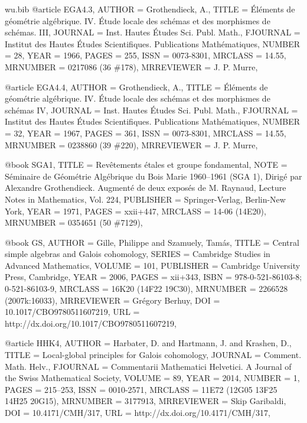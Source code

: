 \documentclass{amsart}
\numberwithin{equation}{section}
\theoremstyle{plain}
\theoremstyle{definition}
\begin{document}
\begin{filecontents}{wu.bib}
@article {EGA4.3, 
    AUTHOR = {Grothendieck, A.},
     TITLE = {\'{E}l\'ements de g\'eom\'etrie alg\'ebrique. {IV}. \'{E}tude
              locale des sch\'emas et des morphismes de sch\'emas. {III}},
   JOURNAL = {Inst. Hautes \'Etudes Sci. Publ. Math.},
  FJOURNAL = {Institut des Hautes \'Etudes Scientifiques. Publications
              Math\'ematiques},
    NUMBER = {28},
      YEAR = {1966},
     PAGES = {255},
      ISSN = {0073-8301},
   MRCLASS = {14.55},
  MRNUMBER = {0217086 (36 \#178)},
MRREVIEWER = {J. P. Murre},
}

@article {EGA4.4, 
    AUTHOR = {Grothendieck, A.},
     TITLE = {\'{E}l\'ements de g\'eom\'etrie alg\'ebrique. {IV}. \'{E}tude
              locale des sch\'emas et des morphismes de sch\'emas {IV}},
   JOURNAL = {Inst. Hautes \'Etudes Sci. Publ. Math.},
  FJOURNAL = {Institut des Hautes \'Etudes Scientifiques. Publications
              Math\'ematiques},
    NUMBER = {32},
      YEAR = {1967},
     PAGES = {361},
      ISSN = {0073-8301},
   MRCLASS = {14.55},
  MRNUMBER = {0238860 (39 \#220)},
MRREVIEWER = {J. P. Murre},
}

@book {SGA1, 
     TITLE = {Rev\^etements \'etales et groupe fondamental},
      NOTE = {S{\'e}minaire de G{\'e}om{\'e}trie Alg{\'e}brique du Bois
              Marie 1960--1961 (SGA 1),
              Dirig{\'e} par Alexandre Grothendieck. Augment{\'e} de deux
              expos{\'e}s de M. Raynaud,
              Lecture Notes in Mathematics, Vol. 224},
 PUBLISHER = {Springer-Verlag, Berlin-New York},
      YEAR = {1971},
     PAGES = {xxii+447},
   MRCLASS = {14-06 (14E20)},
  MRNUMBER = {0354651 (50 \#7129)},
}

@book {GS, 
    AUTHOR = {Gille, Philippe and Szamuely, Tam{\'a}s},
     TITLE = {Central simple algebras and {G}alois cohomology},
    SERIES = {Cambridge Studies in Advanced Mathematics},
    VOLUME = {101},
 PUBLISHER = {Cambridge University Press, Cambridge},
      YEAR = {2006},
     PAGES = {xii+343},
      ISBN = {978-0-521-86103-8; 0-521-86103-9},
   MRCLASS = {16K20 (14F22 19C30)},
  MRNUMBER = {2266528 (2007k:16033)},
MRREVIEWER = {Gr{\'e}gory Berhuy},
       DOI = {10.1017/CBO9780511607219},
       URL = {http://dx.doi.org/10.1017/CBO9780511607219},
}

@article {HHK4, 
    AUTHOR = {Harbater, D. and Hartmann, J. and Krashen, D.},
     TITLE = {Local-global principles for {G}alois cohomology},
   JOURNAL = {Comment. Math. Helv.},
  FJOURNAL = {Commentarii Mathematici Helvetici. A Journal of the Swiss
              Mathematical Society},
    VOLUME = {89},
      YEAR = {2014},
    NUMBER = {1},
     PAGES = {215--253},
      ISSN = {0010-2571},
   MRCLASS = {11E72 (12G05 13F25 14H25 20G15)},
  MRNUMBER = {3177913},
MRREVIEWER = {Skip Garibaldi},
       DOI = {10.4171/CMH/317},
       URL = {http://dx.doi.org/10.4171/CMH/317},
}


\end{filecontents}
\end{document}
